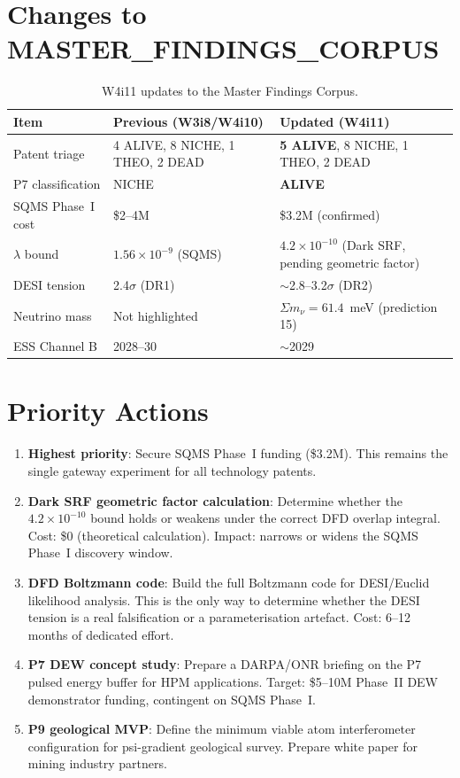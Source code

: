 \documentclass[11pt]{article}
\newcommand{\ee}[1]{\times 10^{#1}}
\begin{document}
\section{Changes to MASTER\_FINDINGS\_CORPUS}

\begin{table}[H]
\centering
\caption{W4i11 updates to the Master Findings Corpus.}
\label{tab:corpus-updates}
\begin{tabular}{@{}lp{5cm}p{5cm}@{}}
\toprule
Item & Previous (W3i8/W4i10) & Updated (W4i11) \\
\midrule
Patent triage & 4 ALIVE, 8 NICHE, 1 THEO, 2 DEAD &
  \textbf{5 ALIVE}, 8 NICHE, 1 THEO, 2 DEAD \\
P7 classification & NICHE & \textbf{ALIVE} \\
SQMS Phase~I cost & \$2--4M & \$3.2M (confirmed) \\
$\lambda$ bound & $1.56\ee{-9}$ (SQMS) &
  $4.2\ee{-10}$ (Dark SRF, pending geometric factor) \\
DESI tension & 2.4$\sigma$ (DR1) & $\sim$2.8--3.2$\sigma$ (DR2) \\
Neutrino mass & Not highlighted & $\Sigma m_\nu = 61.4$~meV (prediction 15) \\
ESS Channel B & 2028--30 & $\sim$2029 \\
\bottomrule
\end{tabular}
\end{table}

\section{Priority Actions}

\begin{enumerate}
\item \textbf{Highest priority}: Secure SQMS Phase~I funding (\$3.2M).
  This remains the single gateway experiment for all technology patents.

\item \textbf{Dark SRF geometric factor calculation}: Determine whether the
  $4.2\ee{-10}$ bound holds or weakens under the correct DFD overlap integral.
  Cost: \$0 (theoretical calculation). Impact: narrows or widens the
  SQMS Phase~I discovery window.

\item \textbf{DFD Boltzmann code}: Build the full Boltzmann code for
  DESI/Euclid likelihood analysis. This is the only way to determine
  whether the DESI tension is a real falsification or a parameterisation
  artefact. Cost: 6--12 months of dedicated effort.

\item \textbf{P7 DEW concept study}: Prepare a DARPA/ONR briefing on
  the P7 pulsed energy buffer for HPM applications. Target: \$5--10M
  Phase~II DEW demonstrator funding, contingent on SQMS Phase~I.

\item \textbf{P9 geological MVP}: Define the minimum viable atom
  interferometer configuration for psi-gradient geological survey.
  Prepare white paper for mining industry partners.
\end{enumerate}
\end{document}
